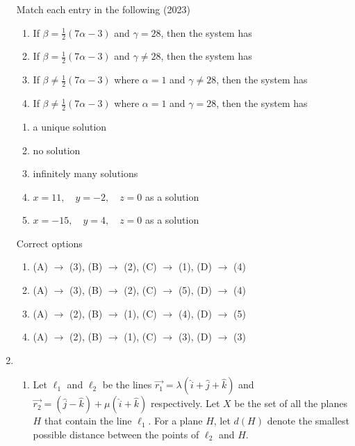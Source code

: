 \begin{enumerate}[label=\thesubsection.\arabic*.,ref=\thesubsection.\theenumi]
Match each entry in the following
\hfill (2023)
\begin{multicols}{2}
	\begin{enumerate}[label=(\Alph*)]
 \item If $\beta = \frac{1}{2} (7\alpha - 3)$ and $\gamma = 28$, then the system has
 \item If $\beta = \frac{1}{2} (7\alpha - 3)$ and $\gamma \neq 28$, then the system has
 \item If $\beta \neq \frac{1}{2} (7\alpha - 3)$ where $\alpha = 1$ and $\gamma \neq 28$, then the system has
 \item If $\beta \neq \frac{1}{2} (7\alpha - 3)$ where $\alpha = 1$ and $\gamma = 28$, 
then the system has
\end{enumerate}
\columnbreak
\begin{enumerate}[label=(\arabic*)]
     \item  a unique solution
     \item  no solution
     \item  infinitely many solutions
     \item  $x = 11, \quad y = -2, \quad z = 0$ as a solution
     \item  $x = -15, \quad y = 4, \quad z = 0$ as a solution
\end{enumerate}
\end{multicols}
Correct options
\begin{enumerate}
 \item (A) $\to$ (3), (B) $\to$ (2), (C) $\to$ (1), (D) $\to$ (4)
 \item (A) $\to$ (3), (B) $\to$ (2), (C) $\to$ (5), (D) $\to$ (4)
 \item (A) $\to$ (2), (B) $\to$ (1), (C) $\to$ (4), (D) $\to$ (5)
 \item (A) $\to$ (2), (B) $\to$ (1), (C) $\to$ (3), (D) $\to$ (3)
\end{enumerate}
\item 
\begin{enumerate}
\item Let $\ell_1$ and $\ell_2$ be the lines  
$
\vec{r_1} = \lambda (\hat{i} + \hat{j} + \hat{k})
$
and  
$
\vec{r_2} = (\hat{j} - \hat{k}) + \mu (\hat{i} + \hat{k})
$
respectively. Let $X$ be the set of all the planes $H$ that contain the line $\ell_1$. For a plane $H$, let $d(H)$ denote the smallest possible distance between the points of $\ell_2$ and $H$.


\end{enumerate}
\end{enumerate}
